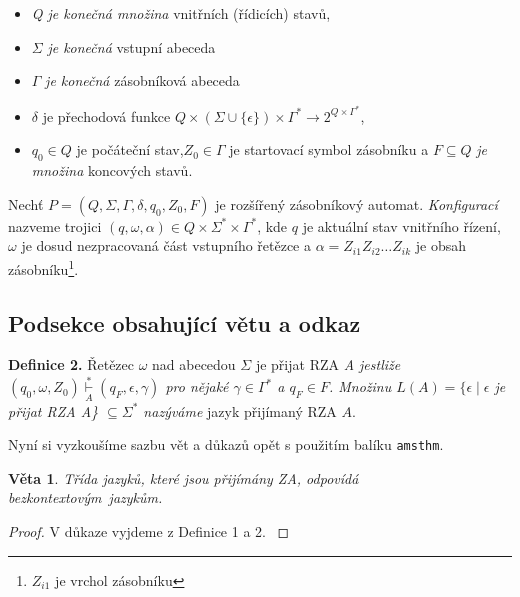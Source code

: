 \documentclass[a4paper, twocolumn, 10pt]{article}
\begin{document}
\begin{itemize}

\item \textit{Q je konečná množina} vnitřních (řídicích) stavů,

\item $\Sigma$ \textit{je konečná} vstupní abeceda

\item $\Gamma$ \textit{je konečná} zásobníková abeceda

\item $\delta$ je přechodová funkce $Q\times(\Sigma\cup\{\epsilon\})\times\Gamma^{\ast}\rightarrow 2^{Q\times\Gamma^{\ast}}$,

\item $q_0 \in Q$ je počáteční stav,$Z_0 \in \Gamma$ je startovací symbol
zásobníku a $F \subseteq Q$ \textit{je množina} koncových stavů.

\end{itemize}

Nechť $P = (Q, \Sigma, \Gamma, \delta, q_0, Z_0, F)$ je rozšířený zásobníkový automat. \textit{Konfigurací} nazveme trojici $(q, \omega, \alpha) \in Q \times \Sigma^{\ast}\times\Gamma^{\ast}$, kde $q$ je aktuální stav vnitřního řízení, $\omega$ je dosud nezpracovaná část vstupního řetězce a $\alpha = Z_{i1}Z_{i2}\ldots Z_{ik}$ je obsah zásobníku\footnote{$Z_{i1}$ je vrchol zásobníku}.

\subsection{Podsekce obsahující větu a odkaz}

\textbf{Definice 2.} Řetězec $\omega$ nad abecedou $\Sigma$ je přijat RZA \textit{A jestliže $(q_0, \omega, Z_0)\overset{\ast}{\underset{A}{\vdash}}(q_F ,\epsilon, \gamma)$ pro nějaké $\gamma \in \Gamma^{\ast}$ a $q_F \in F$. Množinu $L(A) = \{ \epsilon\mid \epsilon$ je přijat RZA A\} $\subseteq\Sigma^{\ast}$ nazýváme} jazyk přijímaný RZA $A$.

\newpage
\newtheorem{theorem2}{Věta}
Nyní si vyzkoušíme sazbu vět a důkazů opět s použitím
balíku \texttt{amsthm}.

\begin{theorem2}Třída jazyků, které jsou přijímány ZA, odpovídá \mbox{bezkontextovým jazykům.} 
\end{theorem2}

\begin{proof}{
V důkaze vyjdeme z Definice 1 a 2.
}\end{proof}
\end{document}
